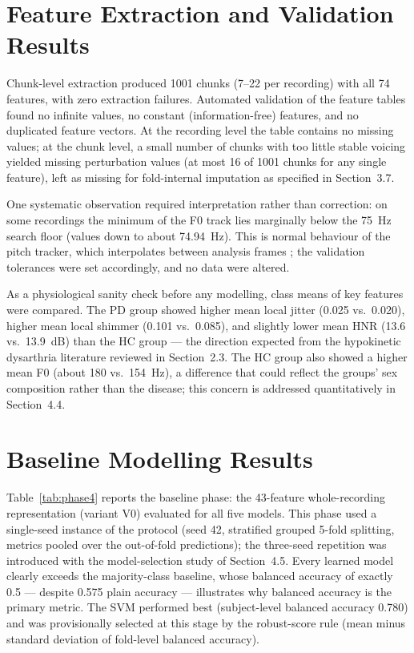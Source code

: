 \section{Feature Extraction and Validation Results}

Chunk-level extraction produced 1001 chunks (7--22 per recording) with
all 74 features, with zero extraction failures. Automated validation
of the feature tables found no infinite values, no constant
(information-free) features, and no duplicated feature vectors. At the
recording level the table contains no missing values; at the chunk
level, a small number of chunks with too little stable voicing yielded
missing perturbation values (at most 16 of 1001 chunks for any single
feature), left as missing for fold-internal imputation as specified in
Section~3.7.

One systematic observation required interpretation rather than
correction: on some recordings the minimum of the F0 track lies
marginally below the 75~Hz search floor (values down to about
74.94~Hz). This is normal behaviour of the pitch tracker, which
interpolates between analysis frames \cite{boersma1993}; the
validation tolerances were set accordingly, and no data were altered.

As a physiological sanity check before any modelling, class means of
key features were compared. The PD group showed higher mean local
jitter (0.025 vs.\ 0.020), higher mean local shimmer (0.101 vs.\
0.085), and slightly lower mean HNR (13.6 vs.\ 13.9~dB) than the HC
group --- the direction expected from the hypokinetic dysarthria
literature reviewed in Section~2.3. The HC group also showed a higher
mean F0 (about 180 vs.\ 154~Hz), a difference that could reflect the
groups' sex composition rather than the disease; this concern is
addressed quantitatively in Section~4.4.

\section{Baseline Modelling Results}

Table~\ref{tab:phase4} reports the baseline phase: the 43-feature
whole-recording representation (variant V0) evaluated for all five
models. This phase used a single-seed instance of the protocol
(seed 42, stratified grouped 5-fold splitting, metrics pooled over the
out-of-fold predictions); the three-seed repetition was introduced with
the model-selection study of Section~4.5. Every learned model clearly
exceeds the
majority-class baseline, whose balanced accuracy of exactly 0.5 ---
despite 0.575 plain accuracy --- illustrates why balanced accuracy is
the primary metric. The SVM performed best (subject-level balanced
accuracy 0.780) and was provisionally selected at this stage by the
robust-score rule (mean minus standard deviation of fold-level
balanced accuracy).

